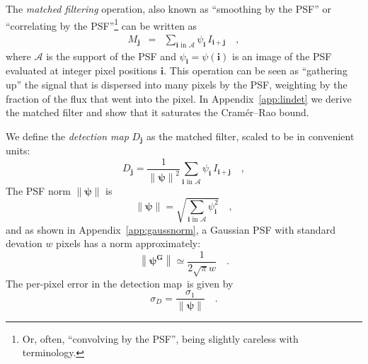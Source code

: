 \documentclass[letterpaper,preprint]{aastex62}
\newcommand{\appref}[1]{\mbox{Appendix~\ref{#1}}}
\newcommand{\detmap}{detection map}
\newcommand{\psf}{\psi}
\newcommand{\psfat}[1]{\psf_{#1}}
\newcommand{\psfnorm}{\norm{\bm{\psf}}}
\newcommand{\norm}[1]{\left\lVert #1 \right\rVert}
\newcommand{\psfw}{w}
\renewcommand{\vec}[1]{\boldsymbol{#1}}
\newcommand{\ivec}{\vec{i}}
\newcommand{\jvec}{\vec{j}}
\newcommand{\iina}{\ivec \,\, \mathrm{in} \,\, \mathcal{A}}
\begin{document}

The \emph{matched filtering} operation, also known as ``smoothing by
the PSF'' or ``correlating by the PSF''\footnote{
  Or, often, ``convolving by the PSF'', being slightly careless with terminology.}
can be written as
\begin{eqnarray}
  M_{\jvec} &=& \sum_{\iina} \psfat{\ivec} \, I_{\ivec + \jvec} \quad ,
\end{eqnarray}
where $\mathcal{A}$ is the support of the PSF and $\psfat{\ivec} =
\psf(\ivec)$ is an image of the PSF evaluated at integer pixel
positions $\ivec$.  This operation can be seen as ``gathering up'' the
signal that is dispersed into many pixels by the PSF, weighting by the
fraction of the flux that went into the pixel.  In
\appref{app:lindet} we derive the matched filter and show that it
saturates the Cram\'er--Rao bound.


We define the \emph{\detmap} $D_{\jvec}$ as the matched filter, scaled to be in convenient units:
\begin{equation}
D_{\jvec} = \frac{1}{\psfnorm^2} \sum_{\iina} \psfat{\ivec} \,
I_{\ivec + \jvec} \quad ,
\label{eq:detmap}
\end{equation}
The PSF norm $\psfnorm$ is
\begin{equation}
\psfnorm = \sqrt{\sum_{\iina} \psfat{\ivec}^2} \quad ,
\end{equation}
and as shown in \appref{app:gaussnorm}, a Gaussian PSF with standard
devation $\psfw$ pixels has a norm approximately:
\begin{equation}
  \norm{\bm{\psf^G}} \simeq \frac{1}{2 \sqrt{\pi} \psfw} \quad .
\end{equation}
The per-pixel error in the \detmap\ is given by
\begin{equation}
\sigma_{D} = \frac{\sigma_1}{\psfnorm} \quad .
\end{equation}
\end{document}
